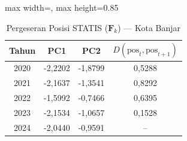 \begin{table}[H]
\centering
\caption{Pergeseran Posisi STATIS ($\mathbf{F}_k$) --- Kota Banjar} \label{tab:app1jarak_statis_skor_kota_banjar}
\begin{adjustbox}{max width=\textwidth, max height=0.85\textheight}
\begin{tabular}{|c|c|c|c|}
\hline
\textbf{Tahun} & \textbf{PC1} & \textbf{PC2} & \textbf{$D(\text{pos}_t, \text{pos}_{t+1})$} \\
\hline
2020 & -2,2202 & -1,8799 & 0,5288 \\
2021 & -2,1637 & -1,3541 & 0,8292 \\
2022 & -1,5992 & -0,7466 & 0,6395 \\
2023 & -2,1534 & -1,0657 & 0,1528 \\
2024 & -2,0440 & -0,9591 & -- \\
\hline
\end{tabular}
\end{adjustbox}
\end{table}